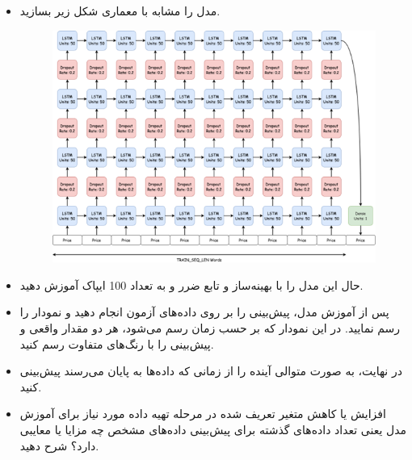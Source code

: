 \documentclass[12pt]{article}
\begin{document}
\begin{enumerate}
\begin{itemize}
        \item   مدل را مشابه با معماری شکل زیر بسازید.
        \begin{figure}[h]  
            \centering
            \includegraphics[width=\textwidth]{figs/Q6_2.png}
            \label{fig:num_pic}  
        \end{figure}
        \item   حال این مدل را با بهینه‌ساز  و تابع ضرر  و  به تعداد 100 ایپاک آموزش دهید.
        \item   پس از آموزش مدل، پیش‌بینی را بر روی داده‌های آزمون انجام دهید و نمودار را رسم نمایید. در این نمودار که بر حسب زمان رسم می‌شود، هر دو مقدار واقعی و پیش‌بینی را با رنگ‌های متفاوت رسم کنید.
        \item   در نهایت، به صورت متوالی آینده را از زمانی که داده‌ها به پایان می‌رسند پیش‌بینی کنید.
        \item   افزایش یا کاهش متغیر تعریف شده در مرحله تهیه داده مورد نیاز برای آموزش مدل یعنی تعداد داده‌های گذشته برای پیش‌بینی داده‌های مشخص چه مزایا یا معایبی دارد؟ شرح دهید.
        
    \end{itemize}

\end{enumerate}
\end{document}

